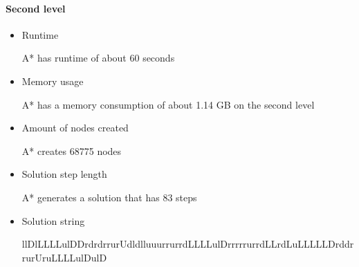 \documentclass[../../maint.tex]{subfiles}
\begin{document}
\paragraph{Second level}

\begin{itemize}

	\item Runtime 		
 		
 	A* has runtime of about 60 seconds
 		
	\item Memory usage
		
	A* has a memory consumption of about 1.14 GB on the second level
	
	\item Amount of nodes created
	
	A* creates 68775 nodes
	
	\item Solution step length
	
	A* generates a solution that has 83 steps
		
	\item Solution string
	
	llDlLLLLulDDrdrdrrurUdldlluuurrurrdLLLLulDrrrrrurrdLLrdLuLLLLLDrddrrurUruLLLLulDulD	
		
 \end{itemize}
\end{document}
